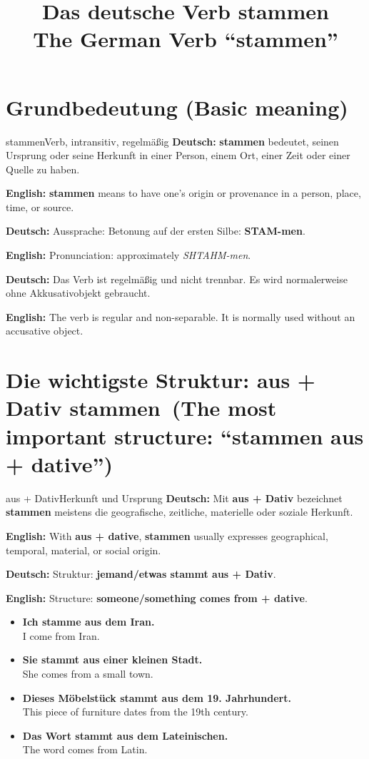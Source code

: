 \documentclass[a4paper,11pt]{article}
\title{Das deutsche Verb \glqq stammen\grqq\\\large The German Verb ``stammen''}
\date{}
\newcommand{\GermanText}[1]{\textbf{Deutsch: }#1\par}
\newcommand{\EnglishText}[1]{{\small\color{SoftGray}\textbf{English: }#1\par}}
\newcommand{\ExampleItem}[2]{\item \textbf{#1}\\{\small\color{SoftGray}#2}}
\begin{document}
\maketitle
\tableofcontents
\newpage

\section{Grundbedeutung \textnormal{(Basic meaning)}}
\begin{grammarentry}{stammen}{Verb, intransitiv, regelmäßig}
\GermanText{\textbf{stammen} bedeutet, seinen Ursprung oder seine Herkunft in einer Person, einem Ort, einer Zeit oder einer Quelle zu haben.}
\EnglishText{\textbf{stammen} means to have one's origin or provenance in a person, place, time, or source.}
\GermanText{Aussprache: Betonung auf der ersten Silbe: \textbf{STAM-men}.}
\EnglishText{Pronunciation: approximately \textit{SHTAHM-men}.}
\GermanText{Das Verb ist regelmäßig und nicht trennbar. Es wird normalerweise ohne Akkusativobjekt gebraucht.}
\EnglishText{The verb is regular and non-separable. It is normally used without an accusative object.}
\end{grammarentry}

\section{Die wichtigste Struktur: \glqq aus + Dativ stammen\grqq\ \textnormal{(The most important structure: ``stammen aus + dative'')}}
\begin{grammarentry}{aus + Dativ}{Herkunft und Ursprung}
\GermanText{Mit \textbf{aus + Dativ} bezeichnet \textbf{stammen} meistens die geografische, zeitliche, materielle oder soziale Herkunft.}
\EnglishText{With \textbf{aus + dative}, \textbf{stammen} usually expresses geographical, temporal, material, or social origin.}
\GermanText{Struktur: \textbf{jemand/etwas stammt aus + Dativ}.}
\EnglishText{Structure: \textbf{someone/something comes from + dative}.}
\end{grammarentry}
\begin{exbox}
\begin{itemize}
\ExampleItem{Ich stamme aus dem Iran.}{I come from Iran.}
\ExampleItem{Sie stammt aus einer kleinen Stadt.}{She comes from a small town.}
\ExampleItem{Dieses Möbelstück stammt aus dem 19. Jahrhundert.}{This piece of furniture dates from the 19th century.}
\ExampleItem{Das Wort stammt aus dem Lateinischen.}{The word comes from Latin.}
\end{itemize}
\end{exbox}
\end{document}
